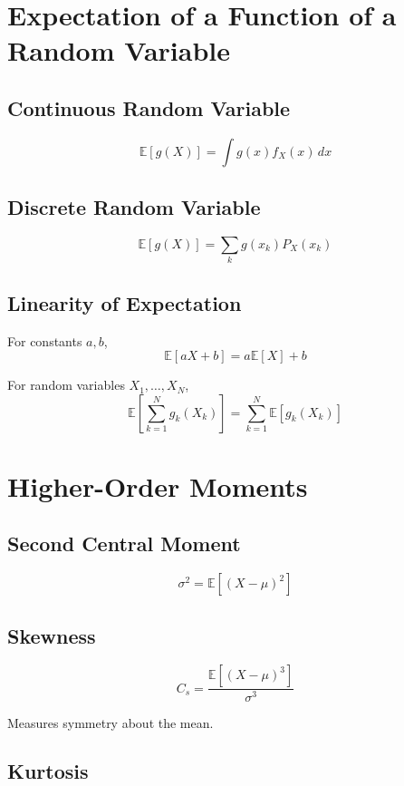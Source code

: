 \documentclass[12pt]{article}
\begin{document}
\section*{Expectation of a Function of a Random Variable}

\subsection*{Continuous Random Variable}

\[
\mathbb{E}[g(X)] = \int g(x) f_X(x) \, dx
\]

\subsection*{Discrete Random Variable}

\[
\mathbb{E}[g(X)] = \sum_k g(x_k) P_X(x_k)
\]

\subsection*{Linearity of Expectation}

For constants $a,b$,
\[
\mathbb{E}[aX + b] = a\mathbb{E}[X] + b
\]

For random variables $X_1,\dots,X_N$,
\[
\mathbb{E}\left[\sum_{k=1}^{N} g_k(X_k)\right]
= \sum_{k=1}^{N} \mathbb{E}[g_k(X_k)]
\]

\section*{Higher-Order Moments}

\subsection*{Second Central Moment}

\[
\sigma^2 = \mathbb{E}[(X-\mu)^2]
\]

\subsection*{Skewness}

\[
C_s = \frac{\mathbb{E}[(X-\mu)^3]}{\sigma^3}
\]

Measures symmetry about the mean.

\subsection*{Kurtosis}
\end{document}
